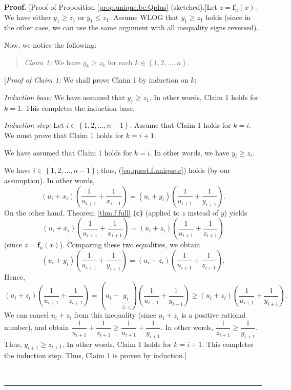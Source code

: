 \documentclass[numbers=enddot,12pt,final,onecolumn,notitlepage]{scrartcl}%
\theoremstyle{definition}
\newenvironment{statement}{\begin{quote}}{\end{quote}}
\newenvironment{proof}[1][Proof]{\noindent\textbf{#1.} }{\ \rule{0.5em}{0.5em}}
\newenvironment{verlong}{}{}
\begin{document}
\begin{verlong}
\begin{proof}
[Proof of Proposition \ref{prop.unique.bc.Qplus} (sketched).]Let
$z=\mathbf{f}_{u}\left(  x\right)  $. We have either $y_{1}\geq z_{1}$ or
$y_{1}\leq z_{1}$. Assume WLOG that $y_{1}\geq z_{1}$ holds (since in the
other case, we can use the same argument with all inequality signs reversed).

Now, we notice the following:

\begin{statement}
\textit{Claim 1:} We have $y_{k}\geq z_{k}$ for each $k\in\left\{
1,2,\ldots,n\right\}  $.
\end{statement}

[\textit{Proof of Claim 1:} We shall prove Claim 1 by induction on $k$:

\textit{Induction base:} We have assumed that $y_{1}\geq z_{1}$. In other
words, Claim 1 holds for $k=1$. This completes the induction base.

\textit{Induction step:} Let $i\in\left\{  1,2,\ldots,n-1\right\}  $. Assume
that Claim 1 holds for $k=i$. We must prove that Claim 1 holds for $k=i+1$.

We have assumed that Claim 1 holds for $k=i$. In other words, we have
$y_{i}\geq z_{i}$.

We have $i\in\left\{  1,2,\ldots,n-1\right\}  $; thus,
(\ref{eq.quest.f.unique.c}) holds (by our assumption). In other words,%
\[
\left(  u_{i}+x_{i}\right)  \left(  \dfrac{1}{u_{i+1}}+\dfrac{1}{x_{i+1}%
}\right)  =\left(  u_{i}+y_{i}\right)  \left(  \dfrac{1}{u_{i+1}}+\dfrac
{1}{y_{i+1}}\right)  .
\]
On the other hand, Theorem \ref{thm.f.full} \textbf{(c)} (applied to $z$
instead of $y$) yields%
\[
\left(  u_{i}+x_{i}\right)  \left(  \dfrac{1}{u_{i+1}}+\dfrac{1}{x_{i+1}%
}\right)  =\left(  u_{i}+z_{i}\right)  \left(  \dfrac{1}{u_{i+1}}+\dfrac
{1}{z_{i+1}}\right)
\]
(since $z=\mathbf{f}_{u}\left(  x\right)  $). Comparing these two equalities,
we obtain%
\[
\left(  u_{i}+y_{i}\right)  \left(  \dfrac{1}{u_{i+1}}+\dfrac{1}{y_{i+1}%
}\right)  =\left(  u_{i}+z_{i}\right)  \left(  \dfrac{1}{u_{i+1}}+\dfrac
{1}{z_{i+1}}\right)  .
\]
Hence,%
\[
\left(  u_{i}+z_{i}\right)  \left(  \dfrac{1}{u_{i+1}}+\dfrac{1}{z_{i+1}%
}\right)  =\left(  u_{i}+\underbrace{y_{i}}_{\geq z_{i}}\right)  \left(
\dfrac{1}{u_{i+1}}+\dfrac{1}{y_{i+1}}\right)  \geq\left(  u_{i}+z_{i}\right)
\left(  \dfrac{1}{u_{i+1}}+\dfrac{1}{y_{i+1}}\right)  .
\]
We can cancel $u_{i}+z_{i}$ from this inequality (since $u_{i}+z_{i}$ is a
positive rational number), and obtain $\dfrac{1}{u_{i+1}}+\dfrac{1}{z_{i+1}%
}\geq\dfrac{1}{u_{i+1}}+\dfrac{1}{y_{i+1}}$. In other words, $\dfrac
{1}{z_{i+1}}\geq\dfrac{1}{y_{i+1}}$. Thus, $y_{i+1}\geq z_{i+1}$. In other
words, Claim 1 holds for $k=i+1$. This completes the induction step. Thus,
Claim 1 is proven by induction.]


\end{proof}
\end{verlong}
\end{document}

